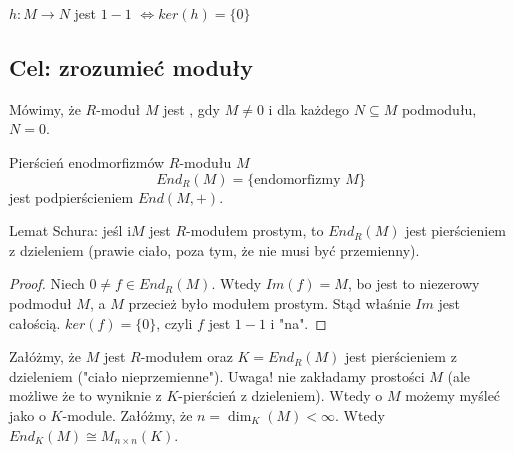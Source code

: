 \begin{theorem}$ $

\begin{center}
\end{center}

\end{theorem}

$h:M\to N$ jest $1-1$ $\iff ker(h)=\{0\}$

\subsection{Cel: zrozumieć moduły}


\begin{definition}
Mówimy, że $R$-moduł $M$ jest , gdy $M\neq 0$ i dla każdego $N\subseteq M$ podmodułu, $N=0$.

Pierścień enodmorfizmów $R$-modułu $M$
$$End_R(M)=\{\text{endomorfizmy }M\}$$
jest podpierścieniem $End(M, +)$.
\end{definition}

\begin{lemma} Lemat Schura: jeśl i$M$ jest $R$-modułem prostym, to $End_R(M)$ jest pierścieniem z dzieleniem (prawie ciało, poza tym, że nie musi być przemienny).
\end{lemma}
\begin{proof}
Niech $0\neq f\in End_R(M)$. Wtedy $Im(f)=M$, bo jest to niezerowy podmoduł $M$, a $M$ przecież było modułem prostym. Stąd właśnie $Im$ jest całością. $ker(f)=\{0\}$, czyli $f$ jest $1-1$ i "na".
\end{proof}

Załóżmy, że $M$ jest $R$-modułem oraz $K=End_R(M)$ jest pierścieniem z dzieleniem ("ciało nieprzemienne"). Uwaga! nie zakładamy prostości $M$ (ale możliwe że to wyniknie z $K$-pierścień z dzieleniem). Wtedy o $M$ możemy myśleć jako o $K$-module. Załóżmy, że $n=\dim_K(M)<\infty$. Wtedy $End_K(M)\cong M_{n\times n}(K)$.

